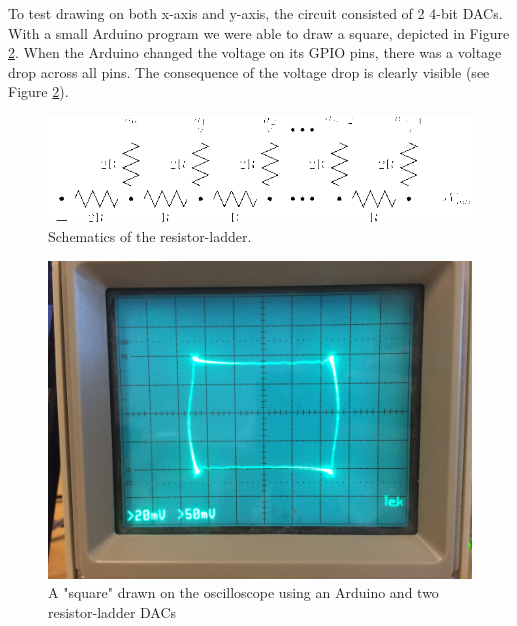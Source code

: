 To test drawing on both x-axis and y-axis, the circuit consisted of 2 4-bit DACs.
With a small Arduino program we were able to draw a square, depicted in Figure \ref{fig:osc_poc}.
When the Arduino changed the voltage on its GPIO pins, there was a voltage drop across all pins.
The consequence of the voltage drop is clearly visible (see Figure \ref{fig:osc_poc}).


\begin{figure}[h]
\includegraphics[width=\columnwidth]{images/r2r-ladder}
\centering
\caption{Schematics of the resistor-ladder\cite{r2r-ladder-schematics}.}
\label{fig:r2r-ladder}
\end{figure}

\begin{figure}[h]
\includegraphics[width=\columnwidth]{images/osc_square_close}
\centering
\caption{A "square" drawn on the oscilloscope using an Arduino and two resistor-ladder DACs}
\label{fig:osc_poc}
\end{figure}